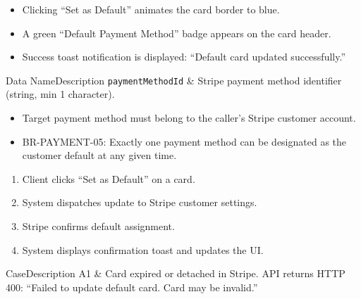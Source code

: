 \begin{itemize}[leftmargin=1.6em,topsep=3pt,itemsep=2pt,parsep=0pt,label=$\bullet$]
      \item Clicking ``Set as Default'' animates the card border to blue.
      \item A green ``Default Payment Method'' badge appears on the card header.
      \item Success toast notification is displayed: ``Default card updated successfully.''
\end{itemize}


\begin{specdatatable}{Data Name}{Description}
      \texttt{paymentMethodId} & Stripe payment method identifier (string, min 1 character).\\ \hline
\end{specdatatable}

\begin{itemize}[leftmargin=1.6em,topsep=3pt,itemsep=2pt,parsep=0pt,label=$\bullet$]
      \item Target payment method must belong to the caller's Stripe customer account.
\end{itemize}

\begin{itemize}[leftmargin=1.6em,topsep=3pt,itemsep=2pt,parsep=0pt,label=$\bullet$]\brrulelist
      \item BR-PAYMENT-05: Exactly one payment method can be designated as the customer default at any given time.
\end{itemize}

\begin{enumerate}[leftmargin=1.8em,topsep=3pt,itemsep=2pt,parsep=0pt]
      \item Client clicks ``Set as Default'' on a card.
      \item System dispatches update to Stripe customer settings.
      \item Stripe confirms default assignment.
      \item System displays confirmation toast and updates the UI.
\end{enumerate}

\begin{flowtable}{Case}{Description}
      A1 & Card expired or detached in Stripe. API returns HTTP 400: ``Failed to update default card. Card may be invalid.''\\ \hline
\end{flowtable}

